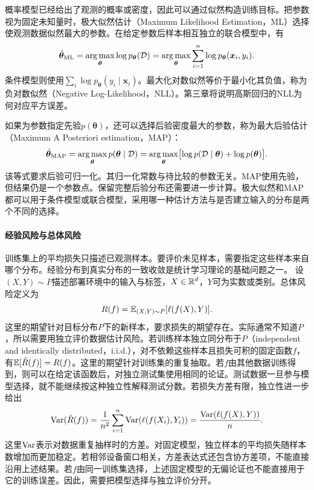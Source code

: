 概率模型已经给出了观测的概率或密度，因此可以通过似然构造训练目标。把参数视为固定未知量时，极大似然估计（Maximum Likelihood Estimation，ML）选择使观测数据似然最大的参数。在给定参数后样本相互独立的联合模型中，有
\begin{equation}
 \hat{\bm{\theta}}_{\mathrm{ML}}
 =\mathop{\mathrm{arg\,max}}_{\bm{\theta}}\log p_{\bm{\theta}}(\mathcal D)
 =\mathop{\mathrm{arg\,max}}_{\bm{\theta}}\sum_{i=1}^{n}\log p_{\bm{\theta}}(\bm{x}_i,y_i).
\end{equation}
条件模型则使用$\sum_i\log p_{\bm\theta}(y_i\mid\bm x_i)$。最大化对数似然等价于最小化其负值，称为负对数似然（Negative Log-Likelihood，NLL）。第三章将说明高斯回归的NLL为何对应平方误差。

如果为参数指定先验$p(\bm\theta)$，还可以选择后验密度最大的参数，称为最大后验估计（Maximum A Posteriori estimation，MAP）：
\begin{equation}
 \hat{\bm{\theta}}_{\mathrm{MAP}}
 =\mathop{\mathrm{arg\,max}}_{\bm{\theta}}p(\bm{\theta}\mid\mathcal D)
 =\mathop{\mathrm{arg\,max}}_{\bm{\theta}}\bigl[\log p(\mathcal D\mid\bm{\theta})+\log p(\bm{\theta})\bigr].
\end{equation}
该等式要求后验可归一化。其归一化常数与待比较的参数无关。MAP使用先验，但结果仍是一个参数点。保留完整后验分布还需要进一步计算。极大似然和MAP都可以用于条件模型或联合模型，采用哪一种估计方法与是否建立输入的分布是两个不同的选择。

\paragraph{经验风险与总体风险}
训练集上的平均损失只描述已观测样本。要评价未见样本，需要指定这些样本来自哪个分布。经验分布到真实分布的一致收敛是统计学习理论的基础问题之一\cite{vapnik1971uniform}。
设$(X,Y)\sim P$描述部署环境中的输入与标签，$X\in\mathbb{R}^d$，$Y$可为实数或类别。总体风险定义为
\begin{equation}
 R(f)=\mathbb{E}_{(X,Y)\sim P}[\ell(f(X),Y)].
\end{equation}
这里的期望针对目标分布$P$下的新样本，要求损失的期望存在。实际通常不知道$P$，所以需要用独立评价数据估计风险。若训练样本独立同分布于$P$（independent and identically distributed，i.i.d.），对不依赖这些样本且损失可积的固定函数$f$，有$\mathbb{E}[\hat R(f)]=R(f)$。这里的期望针对训练集的重复抽取。若$f$由其他数据训练得到，则可以在给定该函数后，对独立测试集使用相同的论证。测试数据一旦参与模型选择，就不能继续按这种独立性解释测试分数。若损失方差有限，独立性进一步给出
\begin{equation}
 \operatorname{Var}(\hat R(f))=\frac{1}{n^2}\sum_{i=1}^n\operatorname{Var}(\ell(f(X_i),Y_i))
 =\frac{\operatorname{Var}(\ell(f(X),Y))}{n}.
\end{equation}
这里$\operatorname{Var}$表示对数据重复抽样时的方差。对固定模型，独立样本的平均损失随样本数增加而更加稳定。若相邻设备窗口相关，方差表达式还包含协方差项，不能直接沿用上述结果。若$f$由同一训练集选择，上述固定模型的无偏论证也不能直接用于它的训练误差。因此，需要把模型选择与独立评价分开。

